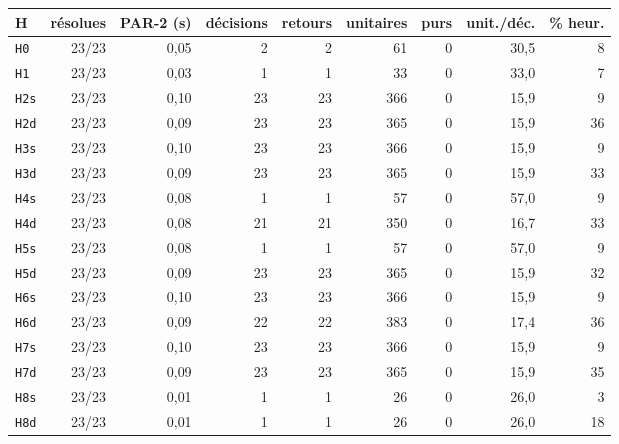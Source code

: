 \begin{tabular}{lrrrrrrrr}
\toprule
H & résolues & PAR-2 (s) & décisions & retours & unitaires & purs & unit./déc. & \% heur. \\
\midrule
\texttt{H0} & 23/23 & 0{,}05 & 2 & 2 & 61 & 0 & 30{,}5 & 8 \\
\texttt{H1} & 23/23 & 0{,}03 & 1 & 1 & 33 & 0 & 33{,}0 & 7 \\
\texttt{H2s} & 23/23 & 0{,}10 & 23 & 23 & 366 & 0 & 15{,}9 & 9 \\
\texttt{H2d} & 23/23 & 0{,}09 & 23 & 23 & 365 & 0 & 15{,}9 & 36 \\
\texttt{H3s} & 23/23 & 0{,}10 & 23 & 23 & 366 & 0 & 15{,}9 & 9 \\
\texttt{H3d} & 23/23 & 0{,}09 & 23 & 23 & 365 & 0 & 15{,}9 & 33 \\
\texttt{H4s} & 23/23 & 0{,}08 & 1 & 1 & 57 & 0 & 57{,}0 & 9 \\
\texttt{H4d} & 23/23 & 0{,}08 & 21 & 21 & 350 & 0 & 16{,}7 & 33 \\
\texttt{H5s} & 23/23 & 0{,}08 & 1 & 1 & 57 & 0 & 57{,}0 & 9 \\
\texttt{H5d} & 23/23 & 0{,}09 & 23 & 23 & 365 & 0 & 15{,}9 & 32 \\
\texttt{H6s} & 23/23 & 0{,}10 & 23 & 23 & 366 & 0 & 15{,}9 & 9 \\
\texttt{H6d} & 23/23 & 0{,}09 & 22 & 22 & 383 & 0 & 17{,}4 & 36 \\
\texttt{H7s} & 23/23 & 0{,}10 & 23 & 23 & 366 & 0 & 15{,}9 & 9 \\
\texttt{H7d} & 23/23 & 0{,}09 & 23 & 23 & 365 & 0 & 15{,}9 & 35 \\
\texttt{H8s} & 23/23 & 0{,}01 & 1 & 1 & 26 & 0 & 26{,}0 & 3 \\
\texttt{H8d} & 23/23 & 0{,}01 & 1 & 1 & 26 & 0 & 26{,}0 & 18 \\
\bottomrule
\end{tabular}
